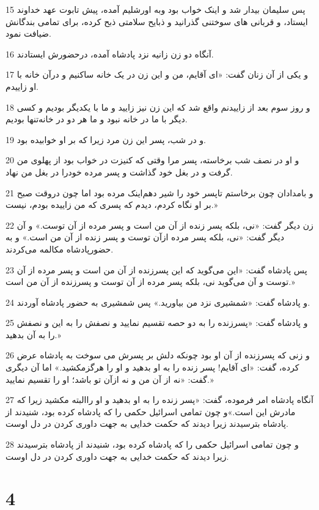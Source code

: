 \par 15 پس سلیمان بیدار شد و اینک خواب بود وبه اورشلیم آمده، پیش تابوت عهد خداوند ایستاد، و قربانی های سوختنی گذرانید و ذبایح سلامتی ذبح کرده، برای تمامی بندگانش ضیافت نمود.
\par 16 آنگاه دو زن زانیه نزد پادشاه آمده، درحضورش ایستادند.
\par 17 و یکی از آن زنان گفت: «ای آقایم، من و این زن در یک خانه ساکنیم و درآن خانه با او زاییدم.
\par 18 و روز سوم بعد از زاییدنم واقع شد که این زن نیز زایید و ما با یکدیگر بودیم و کسی دیگر با ما در خانه نبود و ما هر دو در خانه‌تنها بودیم.
\par 19 و در شب، پسر این زن مرد زیرا که بر او خوابیده بود.
\par 20 و او در نصف شب برخاسته، پسر مرا وقتی که کنیزت در خواب بود از پهلوی من گرفت و در بغل خود گذاشت و پسر مرده خودرا در بغل من نهاد.
\par 21 و بامدادان چون برخاستم تاپسر خود را شیر دهم‌اینک مرده بود اما چون دروقت صبح بر او نگاه کردم، دیدم که پسری که من زاییده بودم، نیست.»
\par 22 زن دیگر گفت: «نی، بلکه پسر زنده از آن من است و پسر مرده از آن توست.» و آن دیگر گفت: «نی، بلکه پسر مرده ازآن توست و پسر زنده از آن من است.» و به حضورپادشاه مکالمه می‌کردند.
\par 23 پس پادشاه گفت: «این می‌گوید که این پسرزنده از آن من است و پسر مرده از آن توست و آن می‌گوید نی، بلکه پسر مرده از آن توست و پسرزنده از آن من است.»
\par 24 و پادشاه گفت: «شمشیری نزد من بیاورید.» پس شمشیری به حضور پادشاه آوردند.
\par 25 و پادشاه گفت: «پسرزنده را به دو حصه تقسیم نمایید و نصفش را به این و نصفش را به آن بدهید.»
\par 26 و زنی که پسرزنده از آن او بود چونکه دلش بر پسرش می سوخت به پادشاه عرض کرده، گفت: «ای آقایم! پسر زنده را به او بدهید و او را هرگزمکشید.» اما آن دیگری گفت: «نه از آن من و نه ازآن تو باشد؛ او را تقسیم نمایید.»
\par 27 آنگاه پادشاه امر فرموده، گفت: «پسر زنده را به او بدهید و او راالبته مکشید زیرا که مادرش این است.»و چون تمامی اسرائیل حکمی را که پادشاه کرده بود، شنیدند از پادشاه بترسیدند زیرا دیدند که حکمت خدایی به جهت داوری کردن در دل اوست.
\par 28 و چون تمامی اسرائیل حکمی را که پادشاه کرده بود، شنیدند از پادشاه بترسیدند زیرا دیدند که حکمت خدایی به جهت داوری کردن در دل اوست.
 
\chapter{4}

